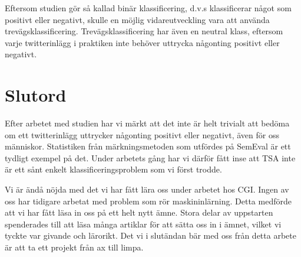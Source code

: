 \documentclass{kaumasters} %
\begin{document}
Eftersom studien gör så kallad binär klassificering, d.v.s klassificerar något  som positivt eller negativt, skulle en möjlig vidareutveckling vara att använda trevägsklassificering. Trevägsklassificering har även en neutral klass, eftersom varje twitterinlägg i praktiken inte behöver uttrycka någonting positivt eller negativt. 
\section{Slutord}
Efter arbetet med studien har vi märkt att det inte är helt trivialt att bedöma om ett twitterinlägg uttrycker någonting positivt eller negativt, även för oss människor. Statistiken från märkningsmetoden som utfördes på SemEval är ett tydligt exempel på det. Under arbetets gång har vi därför fått inse att TSA inte är ett sånt enkelt klassificeringsproblem som vi först trodde. 

Vi är ändå nöjda med det vi har fått lära oss under arbetet hos CGI. Ingen av oss har tidigare arbetat med problem som rör maskininlärning. Detta medförde att vi har fått läsa in 
oss på ett helt nytt ämne. Stora delar av uppstarten spenderades till att läsa många artiklar för att sätta oss in i ämnet, vilket vi tyckte var givande och lärorikt. Det vi i slutändan bär med oss från detta arbete är att ta ett projekt från ax till limpa. 

 



\restoregeometry%
\end{document}
